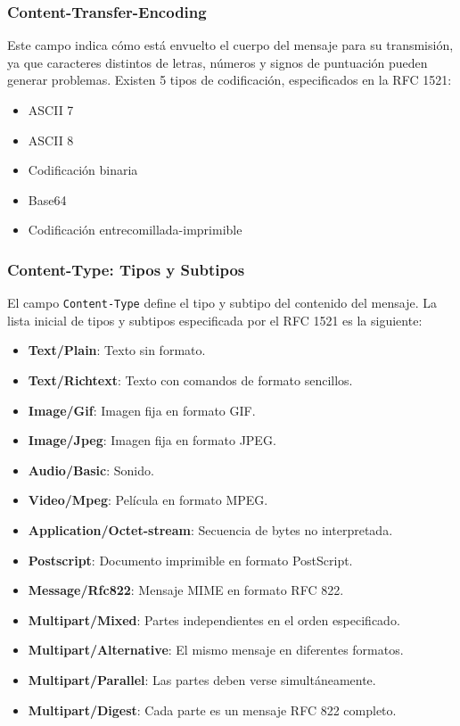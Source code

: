 \documentclass[a4paper,12pt]{article}
\begin{document}
\subsubsection{Content-Transfer-Encoding}
Este campo indica cómo está envuelto el cuerpo del mensaje para su transmisión, ya que caracteres distintos de letras, números y signos de puntuación pueden generar problemas. Existen 5 tipos de codificación, especificados en la RFC 1521:

\begin{itemize}
    \item ASCII 7
    \item ASCII 8
    \item Codificación binaria
    \item Base64
    \item Codificación entrecomillada-imprimible
\end{itemize}

\subsubsection{Content-Type: Tipos y Subtipos}
El campo \texttt{Content-Type} define el tipo y subtipo del contenido del mensaje. La lista inicial de tipos y subtipos especificada por el RFC 1521 es la siguiente:

\begin{itemize}
    \item \textbf{Text/Plain}: Texto sin formato.
    \item \textbf{Text/Richtext}: Texto con comandos de formato sencillos.
    \item \textbf{Image/Gif}: Imagen fija en formato GIF.
    \item \textbf{Image/Jpeg}: Imagen fija en formato JPEG.
    \item \textbf{Audio/Basic}: Sonido.
    \item \textbf{Video/Mpeg}: Película en formato MPEG.
    \item \textbf{Application/Octet-stream}: Secuencia de bytes no interpretada.
    \item \textbf{Postscript}: Documento imprimible en formato PostScript.
    \item \textbf{Message/Rfc822}: Mensaje MIME en formato RFC 822.
    \item \textbf{Multipart/Mixed}: Partes independientes en el orden especificado.
    \item \textbf{Multipart/Alternative}: El mismo mensaje en diferentes formatos.
    \item \textbf{Multipart/Parallel}: Las partes deben verse simultáneamente.
    \item \textbf{Multipart/Digest}: Cada parte es un mensaje RFC 822 completo.
\end{itemize}
\end{document}
